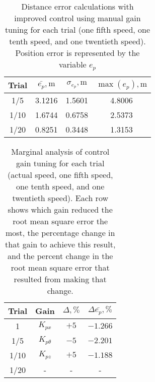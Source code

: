 \documentclass[onecolumn,10pt]{IEEEtran}
\begin{document}
\begin{table}[hb]
\caption{Distance error calculations with improved control using manual gain tuning for each trial (one fifth speed, one tenth speed, and one twentieth speed). Position error is represented by the variable $e_p$}
\label{tab:icRMSE}
\begin{center}
\begin{tabular}{cccc}
\toprule
Trial & $\bar{e_p}, \si{\meter}$ & $\sigma_{e_p}, \si{\meter}$ & $\max(e_p), \si{\meter}$  \\ %
\midrule
1/5 & 3.1216 & 1.5601 & 4.8006 \\
1/10 & 1.6744 & 0.6758 & 2.5373 \\
1/20 & 0.8251 & 0.3448 & 1.3153 \\
\bottomrule
\end{tabular}
\end{center}
\end{table}

\begin{table}[hb]
\caption{Marginal analysis of control gain tuning for each trial (actual speed, one fifth speed, one tenth speed, and one twentieth speed). Each row shows which gain reduced the root mean square error the most, the percentage change in that gain to achieve this result, and the percent change in the root mean square error that resulted from making that change.}
\label{tab:marginalanalysis}
\begin{center}
\begin{tabular}{cccc}
\toprule
Trial & Gain & $\Delta , \%$ & $\Delta \bar{e_p}, \%$  \\ %
\midrule
1 & $K_{px}$ & $+5$ & $-1.266$ \\
1/5 & $K_{p\theta}$ & $-5$ & $-2.201$ \\
1/10 & $K_{pz}$ & $+5$ & $-1.188$ \\
1/20 & - & - & - \\
\bottomrule
\end{tabular}
\end{center}
\end{table}
\end{document}

